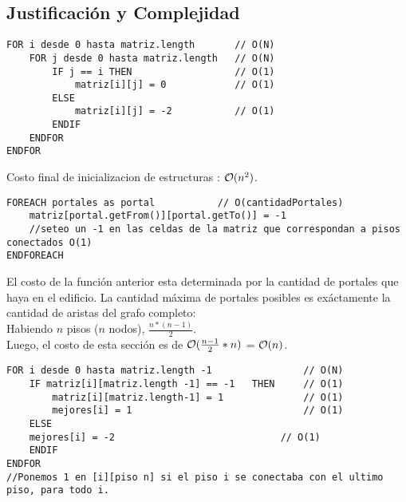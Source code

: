 \subsection{Justificaci\'on y Complejidad}
\begin{lstlisting}
FOR i desde 0 hasta matriz.length       // O(N)
    FOR j desde 0 hasta matriz.length   // O(N)
        IF j == i THEN                  // O(1)
            matriz[i][j] = 0            // O(1)
        ELSE            
            matriz[i][j] = -2           // O(1)
        ENDIF
    ENDFOR
ENDFOR
\end{lstlisting}


Costo final de inicializacion de estructuras : $\mathcal{O}(n^2)$.

\begin{lstlisting}
FOREACH portales as portal           // O(cantidadPortales)
    matriz[portal.getFrom()][portal.getTo()] = -1  
    //seteo un -1 en las celdas de la matriz que correspondan a pisos conectados O(1)
ENDFOREACH
\end{lstlisting}




El costo de la funci\'on anterior esta determinada por la cantidad de portales que haya en el edificio. La cantidad m\'axima de portales posibles es ex\'actamente la cantidad de aristas del grafo completo:\\
Habiendo $n$ pisos ($n$ nodos),  $\frac{n*(n-1)}{2}$. \\
Luego, el costo de esta secci\'on es de $\mathcal{O}(\frac{n-1}{2} * n)$ = $\mathcal{O}(n)$.

\pagebreak


\begin{lstlisting}
FOR i desde 0 hasta matriz.length -1                // O(N) 
    IF matriz[i][matriz.length -1] == -1   THEN     // O(1)
        matriz[i][matriz.length-1] = 1              // O(1)
        mejores[i] = 1                              // O(1)
    ELSE 
	mejores[i] = -2                             // O(1)
    ENDIF
ENDFOR
//Ponemos 1 en [i][piso n] si el piso i se conectaba con el ultimo piso, para todo i.
\end{lstlisting}



